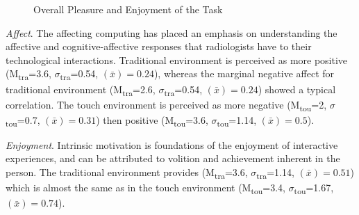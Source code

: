 \documentclass{chi-ext}
\begin{document}
\begin{figure}
\caption{Overall Pleasure and Enjoyment of the Task}
\label{fig:Fig11}
\end{figure}

\textit{Affect}. The affecting computing has placed an emphasis on understanding the affective and cognitive-affective responses that radiologists have to their technological interactions. Traditional environment is perceived as more positive (M\textsubscript{tra}=3.6, $\sigma$\textsubscript{tra}=0.54, {}$\left({\bar x}\right)=0.24$), whereas the marginal negative affect for traditional environment (M\textsubscript{tra}=2.6, $\sigma$\textsubscript{tra}=0.54, {}$\left({\bar x}\right)=0.24$) showed a typical correlation. The touch environment is perceived as more negative (M\textsubscript{tou}=2, $\sigma$\textsubscript{tou}=0.7, {}$\left({\bar x}\right)=0.31$) then positive (M\textsubscript{tou}=3.6, $\sigma$\textsubscript{tou}=1.14, {}$\left({\bar x}\right)=0.5$).

\textit{Enjoyment}. Intrinsic motivation is foundations of the enjoyment of interactive experiences, and can be attributed to volition and achievement inherent in the person. The traditional environment provides (M\textsubscript{tra}=3.6, $\sigma$\textsubscript{tra}=1.14, {}$\left({\bar x}\right)=0.51$) which is almost the same as in the touch environment (M\textsubscript{tou}=3.4, $\sigma$\textsubscript{tou}=1.67, {}$\left({\bar x}\right)=0.74$).
\end{document}

